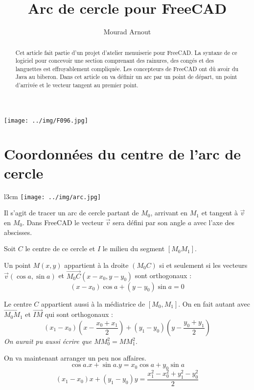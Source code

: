 \documentclass[a4paper]{article}
\begin{document}
\title{Arc de cercle pour FreeCAD}
\author{Mourad Arnout}
\maketitle
\begin{abstract}
Cet article fait partie d'un projet d'atelier menuiserie pour FreeCAD. La syntaxe de ce logiciel pour concevoir une section comprenant des rainures, des congés et des languettes est effroyablement compliquée. Les concepteurs de FreeCAD ont dû avoir du Java au biberon. 
Dans cet article on va définir un arc par un point de départ, un point d'arrivée et le vecteur tangent au premier point. 
\end{abstract}

\texttt{[image: ../img/F096.jpg]}
\newpage
\section{Coordonnées du centre de l'arc de cercle}
\begin{wrapfigure}[6]{l}{3cm}
\texttt{[image: ../img/arc.jpg]}
\end{wrapfigure}
Il s'agit de tracer un arc de cercle partant de $ M_0 $, arrivant en $ M_1 $ et tangent \`a $ \vec{v} $ en $M_0$. Dans FreeCAD le vecteur $\vec{v}$ sera défini par son angle $a$ avec l'axe des abscisses.

Soit $ C $ le centre de ce cercle et $ I $ le milieu du segment $ [M_0 M_1] $.

Un point $ M(x, y) $ appartient \`a la droite $ (M_0 C) $ si et seulement si les vecteurs $ \overrightarrow{v}(\cos a,  \sin a) $ et $ \overrightarrow{M_0 C}(x - x_0 , y - y_0) $ sont orthogonaux :
\begin{equation}
(x - x_0)\cos a + (y - y_0)\sin a = 0  \label{eq:1}
\end{equation}

Le centre $ C $ appartient aussi \`a la m\'ediatrice de $ [M_0 , M_1] $. On en fait autant avec $ \overrightarrow{M_0 M_1} $ et $ \overrightarrow{IM} $ qui sont orthogonaux : 
\begin{equation}
(x_1 - x_0)(x - \frac{ x_0 + x_1 }{2}) + (y_1 - y_0)(y - \frac{ y_0 + y_1 }{2}) \label{eq:2}
\end{equation}
\textit{On aurait pu aussi \'ecrire que $ MM_0 ^2 = MM_1 ^2 $.}

On va maintenant arranger un peu nos affaires.
\begin{equation}
\cos a.x + \sin a.y = x_0 \cos a + y_0 \sin a \label{eq:3}
\end{equation}
\begin{equation}
(x_1 - x_0)x + (y_1 - y_0)y = \frac{x_1 ^2 - x_0 ^2 + y_1 ^2 - y_0 ^2}{2} \label{eq:4}
\end{equation}
\end{document}
